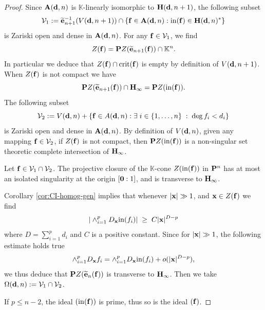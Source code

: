 \documentclass[11pt]{amsart}
\newcommand{\field}[1]{\mathbb{#1}}
\newcommand{\K}{\field{K}}
\newcommand{\wt}[1]{\widetilde{#1}}
\newcommand{\bA}{{\bf A}}
\newcommand{\bbo}{{\bf 0}}
\newcommand{\bd}{{\bf d}}
\newcommand{\be}{{\bf e}}
\newcommand{\bbf}{{\bf f}}
\newcommand{\bH}{{\bf H}}
\newcommand{\bP}{{\bf P}}
\newcommand{\bx}{{\bf x}}
\newcommand{\cV}{\mathcal{V}}
\newcommand{\crit}{{\rm crit}}
\newcommand{\ini}{{\rm in}}
\newcommand{\Omg}{\Omega}
\numberwithin{equation}{section}
\numberwithin{equation}{section}
\begin{document}
\begin{proof}
Since $\bA(\bd,n)$ is $\K$-linearly isomorphic to $\bH(\bd,n+1)$, the 
following subset
$$
\cV_1 := \wt{\be}_{n+1}^{-1}(V(\bd,n+1)) \cap \{\bbf \in \bA(\bd,n) : 
\ini(\bbf)\in \bH(\bd,n)^*\}
$$
is Zariski open and dense in $\bA(\bd,n)$. For any $\bbf \in \cV_1$, we 
find
$$
Z(\bbf) = \bP Z(\wt{\be}_{n+1}(\bbf)) \cap \K^n.
$$
In particular we deduce that $Z(\bbf) \cap \crit(\bbf)$ is empty by 
definition of $V(\bd,n+1)$. 
When $Z(\bbf)$ is not compact we have
$$
\bP Z(\wt{\be}_{n+1}(\bbf)) \cap \bH_\infty = \bP Z(\ini(\bbf)).
$$
The following subset 
$$
\cV_2 := V(\bd,n) + \{\bbf \in A(\bd,n) : \exists \; i \in \{1,\ldots,n\} \;
: \; \deg f_i < d_i\}
$$
is Zariski open and dense in $\bA(\bd,n)$. By definition of $V(\bd,n)$, 
given any mapping $\bbf \in \cV_2$, if $Z(\bbf)$ is not
compact, then $\bP Z(\ini(\bbf))$ is a non-singular set theoretic complete 
intersection  of $\bH_\infty$.
 
Let $\bbf \in \cV_1\cap \cV_2$.  
The projective closure of the $\K$-cone $Z(\ini(\bbf))$ in $\bP^n$
has at most an isolated singularity at the origin $[\bbo:1]$, and is 
transverse to $\bH_\infty$.

Corollary \ref{cor:CI-homog-gen} implies that whenever $|\bx| \gg 1$, 
and $\bx \in Z(\bbf)$ we find
$$
|\wedge_{i=1}^p D_\bx \ini(f_i)|\;\geq \; C|\bx|^{D-p}
$$
where $D = \sum_{i=1}^p d_i$ and $C$ is a positive constant.
Since for $|\bx| \gg 1$, the following estimate holds true
$$
\wedge_{i=1}^p D_\bx f_i = \wedge_{i=1}^p D_\bx \ini(f_i) + 
o(|\bx|^{D-p}),
$$
we thus deduce that $\bP Z(\wt{\be}_n(\bbf))$ is transverse to $\bH_\infty$.
Then we take $\Omg(\bd,n) := \cV_1\cap \cV_2$.

\medskip\noindent
If $p\leq n-2$, the ideal $(\ini(\bbf))$ is prime, thus so is the 
ideal $(\bbf)$.
\end{proof}
%
%
%
%
%
%
%
%
%
%
%
%
%
%
%
%
%
%
%
%
%
%
%
%
%
%
%
%
%
%
%
%
%
%
%
%
%
% 
%
%
%
%
%
%
%
%
%
%
%
%
%
%
%
%
%
%
%
%
\end{document}
